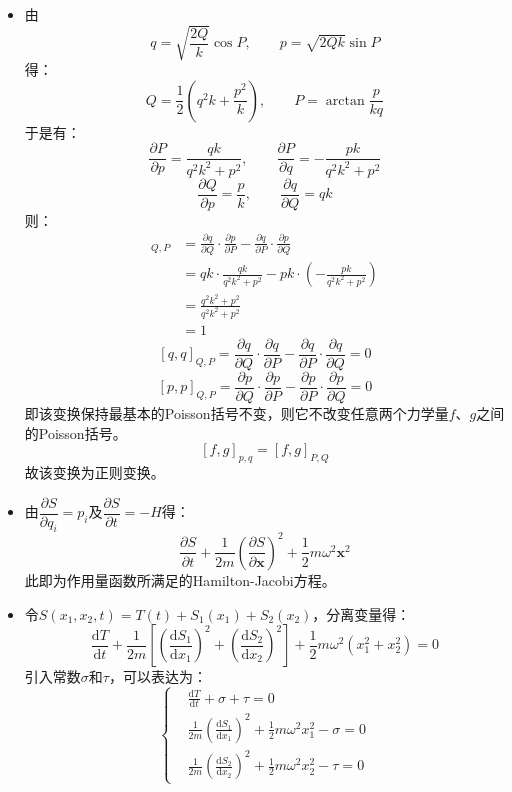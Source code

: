 \documentclass[a4paper,fontset=windows]{ctexart}
\begin{document}
\begin{itemize}
        \item[7.3.(2)]
        由
        \[
        q = \sqrt{\frac{2Q}{k}}\cos P,\qquad p = \sqrt{2Qk}\sin P
        \]
        得：
        \[
        Q = \frac{1}{2}\left(q^2 k + \frac{p^2}{k}\right),\qquad P = \arctan\frac{p}{kq}
        \]
        于是有：
        \[
        \frac{\partial P}{\partial p} = \frac{qk}{q^2 k^2 + p^2},\qquad \frac{\partial P}{\partial q} = -\frac{pk}{q^2 k^2 + p^2}
        \]
        \[
        \frac{\partial Q}{\partial p} = \frac{p}{k},\qquad \frac{\partial q}{\partial Q} = qk
        \]
        则：
        \begin{align*}
            [q,p]_{Q,P}
            &= \frac{\partial q}{\partial Q}\cdot\frac{\partial p}{\partial P} - \frac{\partial q}{\partial P}\cdot\frac{\partial p}{\partial Q} \\
            &= qk\cdot\frac{qk}{q^2 k^2 + p^2} - pk\cdot\left(-\frac{pk}{q^2 k^2 + p^2}\right) \\
            &= \frac{q^2 k^2 + p^2}{q^2 k^2 + p^2} \\
            &= 1
        \end{align*}
        \[
        [q,q]_{Q,P} = \frac{\partial q}{\partial Q}\cdot\frac{\partial q}{\partial P} - \frac{\partial q}{\partial P}\cdot\frac{\partial q}{\partial Q} = 0
        \]
        \[
        [p,p]_{Q,P} = \frac{\partial p}{\partial Q}\cdot\frac{\partial p}{\partial P} - \frac{\partial p}{\partial P}\cdot\frac{\partial p}{\partial Q} = 0
        \]
        即该变换保持最基本的Poisson括号不变，则它不改变任意两个力学量$f$、$g$之间的Poisson括号。
        \[
        [f,g]_{p,q} = [f,g]_{P,Q}
        \]
        故该变换为正则变换。
        \bigskip

        \item[3.(a)]
        由$\dfrac{\partial S}{\partial q_i} = p_i$及$\dfrac{\partial S}{\partial t} = -H$得：
        \[
        \frac{\partial S}{\partial t} + \frac{1}{2m}\left(\frac{\partial S}{\partial\bm{x}}\right)^2 + \frac{1}{2}m\omega^2\bm{x}^2
        \]
        此即为作用量函数所满足的Hamilton-Jacobi方程。
        \medskip

        \item[3.(b)]
        令$S(x_1,x_2,t) = T(t) + S_1(x_1) + S_2(x_2)$，分离变量得：
        \[
        \frac{\mathrm{d}T}{\mathrm{d}t} + \frac{1}{2m}\left[\left(\frac{\mathrm{d}S_1}{\mathrm{d}x_1}\right)^2 + \left(\frac{\mathrm{d}S_2}{\mathrm{d}x_2}\right)^2\right] + \frac{1}{2}m\omega^2\left(x_1^2 + x_2^2\right) = 0
        \]
        引入常数$\sigma$和$\tau$，可以表达为：
        \[
        \left\{
        \begin{aligned}
            &\frac{\mathrm{d}T}{\mathrm{d}t} + \sigma + \tau = 0 \\
            &\frac{1}{2m}\left(\frac{\mathrm{d}S_1}{\mathrm{d}x_1}\right)^2 + \frac{1}{2}m\omega^2 x_1^2 - \sigma = 0 \\
            &\frac{1}{2m}\left(\frac{\mathrm{d}S_2}{\mathrm{d}x_2}\right)^2 + \frac{1}{2}m\omega^2 x_2^2 - \tau = 0
        \end{aligned}
        \right.
        \]
        \medskip


\end{itemize}
\end{document}
